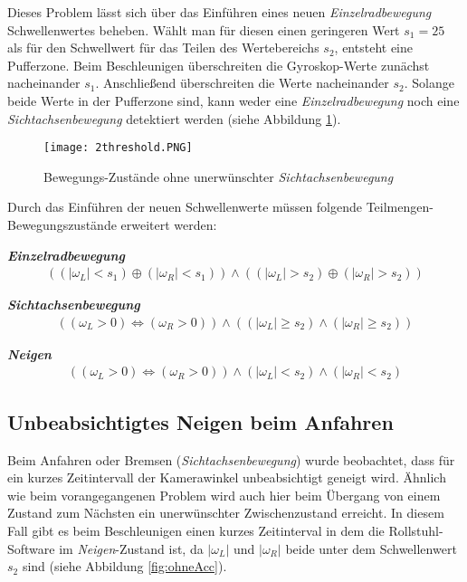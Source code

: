 Dieses Problem lässt sich über das Einführen eines neuen \textit{Einzelradbewegung} Schwellenwertes beheben.
Wählt man für diesen einen geringeren Wert $s_1 = 25$ als für den Schwellwert für das Teilen des Wertebereichs $s_2$, entsteht eine Pufferzone.
Beim Beschleunigen überschreiten die Gyroskop-Werte zunächst nacheinander $s_1$. Anschließend überschreiten die Werte nacheinander $s_2$.
Solange beide Werte in der Pufferzone sind, kann weder eine \textit{Einzelradbewegung} noch eine \textit{Sichtachsenbewegung} detektiert werden (siehe Abbildung \ref{fig:2_threshold}).

\begin{figure}[h]
    \centering
    \texttt{[image: 2threshold.PNG]}
    \caption{Bewegungs-Zustände ohne unerwünschter \textit{Sichtachsenbewegung}}
    \label{fig:2_threshold}
\end{figure}

Durch das Einführen der neuen Schwellenwerte müssen folgende Teilmengen-Bewegungszustände erweitert werden:

\textbf{\textit{Einzelradbewegung}}
\begin{align}
    ((|\omega_L| < s_1) \oplus (|\omega_R| < s_1)) \land ((|\omega_L| > s_2) \oplus (|\omega_R| > s_2))
\end{align}

\textbf{\textit{Sichtachsenbewegung}}
\begin{align}
    ((\omega_L > 0) \Leftrightarrow (\omega_R > 0)) \land ((|\omega_L| \geq s_2) \land (|\omega_R| \geq s_2))
\end{align}

\textbf{\textit{Neigen}}
\begin{align}
    ((\omega_L > 0) \Leftrightarrow (\omega_R > 0)) \land (|\omega_L| < s_2) \land (|\omega_R| < s_2)
\end{align}

\subsection{Unbeabsichtigtes Neigen beim Anfahren}
Beim Anfahren oder Bremsen (\textit{Sichtachsenbewegung}) wurde beobachtet, dass für ein kurzes Zeitintervall der Kamerawinkel unbeabsichtigt geneigt wird.
Ähnlich wie beim vorangegangenen Problem wird auch hier beim Übergang von einem Zustand zum Nächsten ein unerwünschter Zwischenzustand erreicht.
In diesem Fall gibt es beim Beschleunigen einen kurzes Zeitinterval in dem die Rollstuhl-Software im \textit{Neigen}-Zustand ist, da $|\omega_L|$ und $|\omega_R|$ beide unter dem Schwellenwert $s_2$ sind (siehe Abbildung \ref{fig:ohneAcc}).

